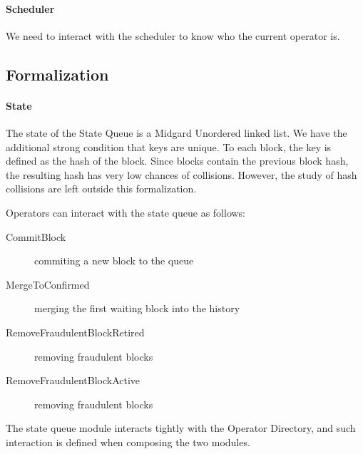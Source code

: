 \paragraph{Scheduler}
%
We need to interact with the scheduler to know who the current operator is.

\subsection{Formalization}

\paragraph{State}
%
The state of the State Queue is a Midgard Unordered linked list.
%
We have the additional strong condition that keys are unique.
%
To each block, the key is defined as the hash of the block.
%
Since blocks contain the previous block hash, the resulting hash has very low
chances of collisions.
%
However, the study of hash collisions are left outside this formalization.

\begin{definition}
  \label{dfn:StateQueue.State.Actions}
  \leanok
  Operators can interact with the state queue as follows:
  \begin{description}
    \item[CommitBlock] commiting a new block to the queue
    \item[MergeToConfirmed]  merging the first waiting block into the history
    \item[RemoveFraudulentBlockRetired] removing fraudulent blocks
    \item[RemoveFraudulentBlockActive] removing fraudulent blocks
  \end{description}
\end{definition}

The state queue module interacts tightly with the Operator Directory, and such
interaction is defined when composing the two modules.

\begin{definition}
  \label{dfn:StateQueue.Relation}
  \leanok
\end{definition}

\begin{theorem}
  \label{thm:StateQueue.Computational.computational}
  \leanok
\end{theorem}


